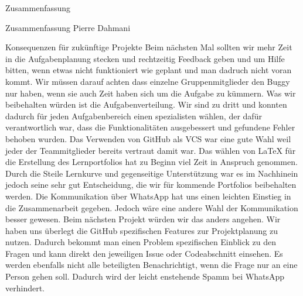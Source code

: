 \documentclass[12pt]{report}
\begin{document}
\begin{section}{Zusammenfassung}
\begin{subsection}{Zusammenfassung Pierre Dahmani}
            \begin{paragraphwithnewline}{Konsequenzen für zukünftige Projekte}
            Beim nächsten Mal sollten wir mehr Zeit in die Aufgabenplanung stecken
            und rechtzeitig Feedback geben und um Hilfe bitten, wenn etwas nicht
            funktioniert wie geplant und man dadruch nicht voran kommt. Wir müssen
            darauf achten dass einzelne Gruppenmitglieder den Buggy nur haben, wenn
            sie auch Zeit haben sich um die Aufgabe zu kümmern. Was wir beibehalten
            würden ist die Aufgabenverteilung. Wir sind zu dritt und konnten dadurch
            für jeden Aufgabenbereich einen spezialisten wählen, der dafür verantwortlich
            war, dass die Funktionalitäten ausgebessert und gefundene Fehler behoben wurden.
            Das Verwenden von GitHub als VCS war eine gute Wahl weil jeder der
            Teammitglieder bereits vertraut damit war. Das wählen von \LaTeX\xspace
            für die Erstellung des Lernportfolios hat zu Beginn viel Zeit in Anspruch
            genommen. Durch die Steile Lernkurve und gegenseitige Unterstützung war
            es im Nachhinein jedoch seine sehr gut Entscheidung, die wir für kommende
            Portfolios beibehalten werden. Die Kommunikation über WhatsApp hat uns
            einen leichten Einstieg in die Zusammenarbeit gegeben. Jedoch wäre eine
            andere Wahl der Kommunikation besser gewesen. Beim nächsten Projekt würden
            wir das anders angehen. Wir haben uns überlegt die GitHub spezifischen
            Features zur Projektplanung zu nutzen. Dadurch bekommt man einen Problem
            spezifischen Einblick zu den Fragen und kann direkt den jeweiligen Issue
            oder Codeabschnitt einsehen. Es werden ebenfalls nicht alle beteiligten
            Benachrichtigt, wenn die Frage nur an eine Person gehen soll. Dadurch wird
            der leicht enstehende Spamm bei WhatsApp verhindert.
            \end{paragraphwithnewline}


\end{subsection}
\end{section}
\end{document}
